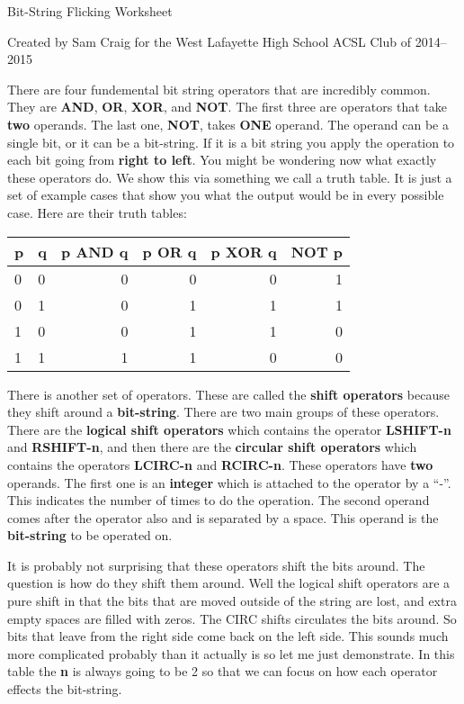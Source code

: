 \documentclass[12pt,letterpaper]{article}
\begin{document}
\begin{center}
  Bit-String Flicking Worksheet

  Created by Sam Craig for the West Lafayette High School ACSL Club of 2014--2015
\end{center}

There are four fundemental bit string operators that are incredibly common. They are \textbf{AND}, \textbf{OR}, \textbf{XOR}, and \textbf{NOT}. The first three are operators that take \textbf{two} operands. The last one, \textbf{NOT}, takes \textbf{ONE} operand. The operand can be a single bit, or it can be a bit-string. If it is a bit string you apply the operation to each bit going from \textbf{right to left}. You might be wondering now what exactly these operators do. We show this via something we call a truth table. It is just a set of example cases that show you what the output would be in every possible case. Here are their truth tables:

\begin{center}
  \begin{tabular}{ l | l || r | r | r | r}
    \hline
    p & q & p \textbf{AND} q & p \textbf{OR} q & p \textbf{XOR} q & \textbf{NOT} p \\
    \hline \hline
    0 & 0 & 0 & 0 & 0 & 1 \\
    0 & 1 & 0 & 1 & 1 & 1 \\
    1 & 0 & 0 & 1 & 1 & 0 \\
    1 & 1 & 1 & 1 & 0 & 0 \\
    \hline
  \end{tabular}
\end{center}

There is another set of operators. These are called the \textbf{shift operators} because they shift around a \textbf{bit-string}. There are two main groups of these operators. There are the \textbf{logical shift operators} which contains the operator \textbf{LSHIFT-n} and \textbf{RSHIFT-n}, and then there are the \textbf{circular shift operators} which contains the operators \textbf{LCIRC-n} and \textbf{RCIRC-n}. These operators have \textbf{two} operands. The first one is an \textbf{integer} which is attached to the operator by a ``-''. This indicates the number of times to do the operation. The second operand comes after the operator also and is separated by a space. This operand is the \textbf{bit-string} to be operated on.

It is probably not surprising that these operators shift the bits around. The question is how do they shift them around. Well the logical shift operators are a pure shift in that the bits that are moved outside of the string are lost, and extra empty spaces are filled with zeros. The CIRC shifts circulates the bits around. So bits that leave from the right side come back on the left side. This sounds much more complicated probably than it actually is so let me just demonstrate. In this table the \textbf{n} is always going to be 2 so that we can focus on how each operator effects the bit-string.
\end{document}
